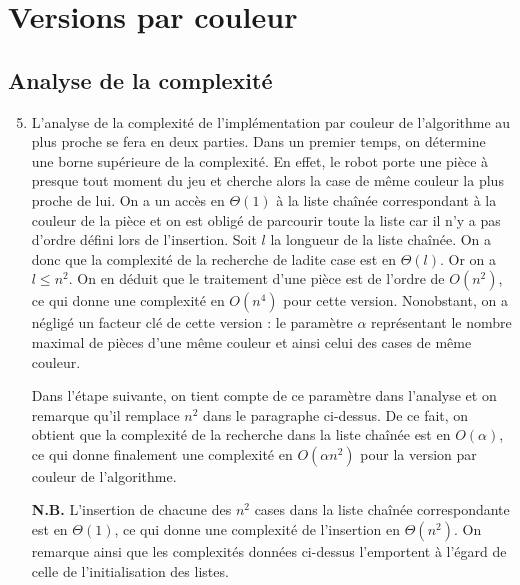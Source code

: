 \documentclass[12pt,a4paper]{article}
\begin{document}
\section{Versions par couleur}
\subsection*{Analyse de la complexit\'e}
\begin{enumerate}
\setcounter{enumi}{4}
\item L'analyse de la complexit\'e de l'impl\'ementation par couleur de 
l'algorithme au plus proche se fera en deux parties. Dans un premier temps, 
on d\'etermine une borne sup\'erieure de la complexit\'e. En effet, le 
robot porte une pi\`ece \`a presque tout moment du jeu et cherche alors la 
case de m\^eme couleur la plus proche de lui. On a un acc\`es en $\Theta(1)$ \`a 
la liste cha\^in\'ee correspondant \`a la couleur de la pi\`ece et on est 
oblig\'e de parcourir toute la liste car il n'y a pas d'ordre d\'efini 
lors de l'insertion. Soit $l$ la longueur de la liste cha\^in\'ee. On a donc que 
la complexit\'e de la recherche de ladite case est en $\Theta(l)$. Or on a $l 
\leq n^2$. On en d\'eduit que le traitement d'une pi\`ece est de l'ordre de 
$O(n^2)$, ce qui donne une complexit\'e en $O(n^4)$ pour cette version. 
Nonobstant, on a n\'eglig\'e un facteur cl\'e de cette version : le param\`etre 
$\alpha$ repr\'esentant le nombre maximal de pi\`eces d'une m\^eme couleur et 
ainsi celui des cases de m\^eme couleur. \par
Dans l'\'etape suivante, on tient compte de ce param\`etre dans l'analyse 
et on remarque qu'il remplace $n^2$ dans le paragraphe ci-dessus. De ce fait, 
on obtient que la complexit\'e de la recherche dans la liste cha\^in\'ee est en 
$O(\alpha)$, ce qui donne finalement une complexit\'e en $O(\alpha n^2)$ pour la 
version par couleur de l'algorithme.

{\bfseries N.B.} L'insertion de chacune des $n^2$ cases dans la liste 
cha\^in\'ee correspondante est en $\Theta(1)$, ce qui donne une complexit\'e de 
l'insertion en $\Theta(n^2)$. On remarque ainsi que les complexit\'es donn\'ees 
ci-dessus l'emportent \`a l'\'egard de celle de l'initialisation des listes.

\end{enumerate}
\end{document}
